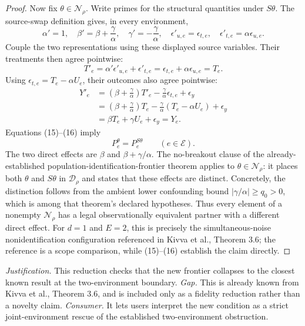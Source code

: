 \documentclass{article}
\begin{document}
\begin{proof}
Now fix \(\theta\in\mathcal N_\rho\).  Write primes for the structural quantities under \(S\theta\).  The source-swap definition gives, in every environment,
\[
 \alpha'=1,
 \quad
 \beta'=\beta+\frac{\gamma}{\alpha},
 \quad
 \gamma'=-\frac{\gamma}{\alpha},
 \quad
 \epsilon'_{u,e}=\epsilon_{t,e},
 \quad
 \epsilon'_{t,e}=\alpha\epsilon_{u,e}.
\]
Couple the two representations using these displayed source variables.  Their treatments then agree pointwise:
\[
 T'_e
 =\alpha'\epsilon'_{u,e}+\epsilon'_{t,e}
 =\epsilon_{t,e}+\alpha\epsilon_{u,e}
 =T_e.
 \tag{15}
\]
Using \(\epsilon_{t,e}=T_e-\alpha U_e\), their outcomes also agree pointwise:
\[
 \begin{aligned}
 Y'_e
 &=\left(\beta+\frac{\gamma}{\alpha}\right)T'_e
   -\frac{\gamma}{\alpha}\epsilon_{t,e}+\epsilon_y\\
 &=\left(\beta+\frac{\gamma}{\alpha}\right)T_e
   -\frac{\gamma}{\alpha}(T_e-\alpha U_e)+\epsilon_y\\
 &=\beta T_e+\gamma U_e+\epsilon_y
 =Y_e.
 \end{aligned}
 \tag{16}
\]
Equations (15)--(16) imply
\[
 P_e^{\theta}=P_e^{S\theta}
 \qquad(e\in\mathcal E).
\]
The two direct effects are \(\beta\) and \(\beta+\gamma/\alpha\).  The no-breakout clause of the already-established population-identification-frontier theorem applies to \(\theta\in\mathcal N_\rho\): it places both \(\theta\) and \(S\theta\) in \(\mathcal D_\rho\) and states that these effects are distinct.  Concretely, the distinction follows from the ambient lower confounding bound \(|\gamma/\alpha|\geq q_0>0\), which is among that theorem's declared hypotheses.  Thus every element of a nonempty \(\mathcal N_\rho\) has a legal observationally equivalent partner with a different direct effect.  For \(d=1\) and \(E=2\), this is precisely the simultaneous-noise nonidentification configuration referenced in Kivva et al., Theorem 3.6; the reference is a scope comparison, while (15)--(16) establish the claim directly.
\end{proof}
\par\smallskip\noindent \textit{Justification.} This reduction checks that the new frontier collapses to the closest known result at the two-environment boundary. \textit{Gap.} This is already known from Kivva et al., Theorem 3.6, and is included only as a fidelity reduction rather than a novelty claim. \textit{Consumer.} It lets users interpret the new condition as a strict joint-environment rescue of the established two-environment obstruction.
\end{document}
